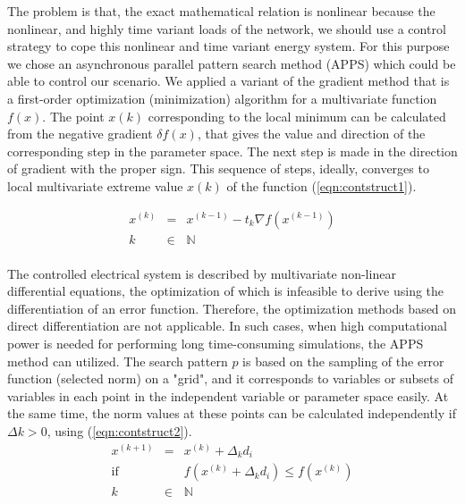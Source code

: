         The problem is that, the exact mathematical relation is nonlinear because the nonlinear, and highly time variant loads of the network, we should use a control strategy to cope this nonlinear and time variant energy system. For this purpose we chose an asynchronous parallel pattern search method (APPS) which could be able to control our scenario.  We applied a variant of the gradient method that is a first-order optimization (minimization) algorithm for a multivariate function $f(x)$. The point $x(k)$ corresponding to the local minimum can be calculated from the negative gradient $\delta f(x)$, that gives the value and direction of the corresponding step in the parameter space. The next step is made in the direction of gradient with the proper sign. This sequence of steps, ideally, converges to local multivariate extreme value $x(k)$ of the function (\ref{eqn:contstruct1}).

        \begin{equation}
        \begin{array}{rcl}
        \label{eqn:contstruct1}
         x^{(k)}&=&x^{(k-1)}-t_k \nabla f(x^{(k-1)})\\
         k&\in&\mathbb{N}\\
         \end{array}
        \end{equation}

        The controlled electrical system is described by multivariate non-linear differential equations, the optimization of which is infeasible to derive using the differentiation of an error function. Therefore, the optimization methods based on direct differentiation are not applicable. In such cases, when high computational power is needed for performing long time-consuming simulations, the APPS method can utilized. The search pattern $p$ is based on the sampling of the error function (selected norm) on a "grid", and it corresponds to variables or subsets of variables in each point in the independent variable or parameter space easily. At the same time, the norm values at these points can be calculated independently if $\Delta k>0$, using (\ref{eqn:contstruct2}).
        \begin{equation}
        \label{eqn:contstruct2}
        \begin{array}{rcl}
         x^{(k+1)}&=&x^{(k)}+\Delta _kd_i \\
         \mathrm{if}&&f(x^{(k)}+\Delta _kd_i) \leq f(x^{(k)})\\
         k&\in&\mathbb{N}\\
         \end{array}
        \end{equation}


